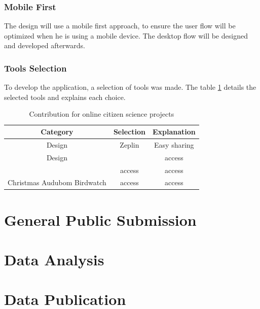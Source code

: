 \subsubsection{Mobile First}

The design will use a mobile first approach, to ensure the user flow will be optimized when he is using a mobile device. The desktop flow will be designed and developed afterwards.

\subsubsection{Tools Selection}

To develop the application, a selection of tools was made. The table \ref{tab:tools-selection} details the selected tools and explains each choice.

\begin{table}[h]
    \centering
    \begin{tabular}{|c|c|c|}
        \hline Category & Selection & Explanation \\
        \hline Design & Zeplin & Easy sharing  \\ 
        \hline Design &  & access \\ 
        \hline  & access & access \\ 
        \hline Christmas Audubom Birdwatch & access & access \\ \hline 
    \end{tabular}
    \caption{Contribution for online citizen science projects}
    \label{tab:tools-selection}
\end{table}


\section{General Public Submission}
\label{sec:proposal-public-submission}

\section{Data Analysis}
\label{sec:proposal-data-analysis}

\section{Data Publication}
\label{sec:proposal-data-publication}